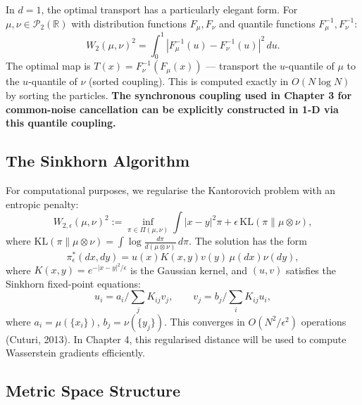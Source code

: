 \begin{example}
\label{ex:mp-1d-wasserstein}
In $d=1$, the optimal transport has a particularly elegant form. For
$\mu, \nu \in \mathcal{P}_2(\mathbb{R})$ with distribution functions $F_\mu, F_\nu$ and
quantile functions $F_\mu^{-1}, F_\nu^{-1}$:
\begin{equation}
    W_2(\mu,\nu)^2 = \int_0^1 |F_\mu^{-1}(u) - F_\nu^{-1}(u)|^2\, du.
    \label{eq:1d-wasserstein}
\end{equation}
The optimal map is $T(x) = F_\nu^{-1}(F_\mu(x))$ --- transport the $u$-quantile of $\mu$
to the $u$-quantile of $\nu$ (sorted coupling). This is computed exactly in
$O(N \log N)$ by sorting the particles. \textbf{The synchronous coupling used in
Chapter 3 for common-noise cancellation can be explicitly constructed in 1-D via this
quantile coupling.}
\end{example}

\subsection{The Sinkhorn Algorithm}
\label{sec:mp-sinkhorn}

For computational purposes, we regularise the Kantorovich problem with an entropic
penalty:
\begin{equation}
    W_{2,\epsilon}(\mu,\nu)^2 := \inf_{\pi \in \Pi(\mu,\nu)} \int |x-y|^2 \pi +
    \epsilon\, \mathrm{KL}(\pi \| \mu \otimes \nu),
    \label{eq:sinkhorn-regularised}
\end{equation}
where $\mathrm{KL}(\pi\|\mu\otimes\nu) = \int \log\frac{d\pi}{d(\mu\otimes\nu)}\, d\pi$.
The solution has the form
\[
    \pi_\epsilon^*(dx,dy) = u(x) K(x,y) v(y)\, \mu(dx)\nu(dy),
\]
where
$K(x,y) = e^{-|x-y|^2/\epsilon}$ is the Gaussian kernel, and $(u,v)$ satisfies the
Sinkhorn fixed-point equations:
\begin{equation}
    u_i = a_i \Big/ \sum_j K_{ij} v_j, \qquad v_j = b_j \Big/ \sum_i K_{ij} u_i,
    \label{eq:sinkhorn-fixed-point}
\end{equation}
where $a_i = \mu(\{x_i\})$, $b_j = \nu(\{y_j\})$. This converges in $O(N^2/\epsilon^2)$
operations (Cuturi, 2013). In Chapter 4, this regularised distance will be used to
compute Wasserstein gradients efficiently.

\subsection{Metric Space Structure}

